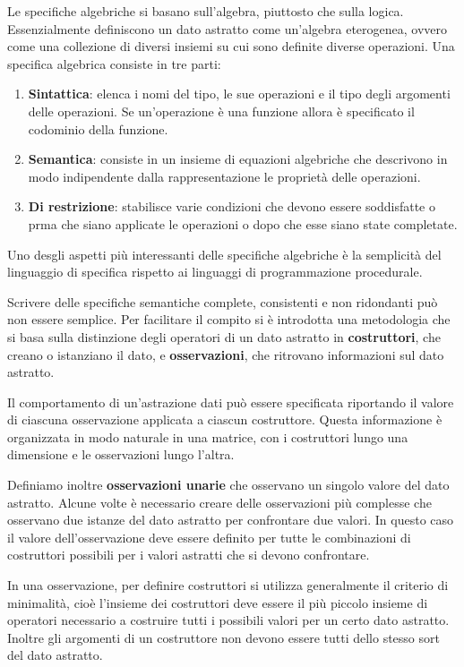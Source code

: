 \documentclass[a4paper,18pt]{extarticle}
\begin{document}
 Le specifiche algebriche si basano sull'algebra, piuttosto che sulla logica. Essenzialmente definiscono un dato astratto come un'algebra eterogenea, ovvero come una collezione di diversi insiemi su cui sono definite diverse operazioni. Una specifica algebrica consiste in tre parti:
 
 \begin{enumerate}
    \item \textbf{Sintattica}: elenca i nomi del tipo, le sue operazioni e il tipo degli argomenti delle operazioni. Se un'operazione è una funzione allora è specificato il codominio della funzione.
    \item \textbf{Semantica}: consiste in un insieme di equazioni algebriche che descrivono in modo indipendente dalla rappresentazione le proprietà delle operazioni.
    \item \textbf{Di restrizione}: stabilisce varie condizioni che devono essere soddisfatte o prma che siano applicate le operazioni o dopo che esse siano state completate.
\end{enumerate}

Uno desgli aspetti più interessanti delle specifiche algebriche è la semplicità del linguaggio di specifica rispetto ai linguaggi di programmazione procedurale.

Scrivere delle specifiche semantiche complete, consistenti e non ridondanti può non essere semplice. Per facilitare il compito si è introdotta una metodologia che si basa sulla distinzione degli operatori di un dato astratto in \textbf{costruttori}, che creano o istanziano il dato, e \textbf{osservazioni}, che ritrovano informazioni sul dato astratto.

Il comportamento di un'astrazione dati può essere specificata riportando il valore di ciascuna osservazione applicata a ciascun costruttore. Questa informazione è organizzata in modo naturale in una matrice, con i costruttori lungo una dimensione e le osservazioni lungo l'altra.

Definiamo inoltre \textbf{osservazioni unarie} che osservano un singolo valore del dato astratto. Alcune volte è necessario creare delle osservazioni più complesse che osservano due istanze del dato astratto per confrontare due valori. In questo caso il valore dell'osservazione deve essere definito per tutte le combinazioni di costruttori possibili per i valori astratti che si devono confrontare.

In una osservazione, per definire  costruttori si utilizza generalmente il criterio di minimalità, cioè l'insieme dei costruttori deve essere il più piccolo insieme di operatori necessario a costruire tutti i possibili valori per un certo dato astratto. Inoltre gli argomenti di un costruttore non devono essere tutti dello stesso sort del dato astratto.
\end{document}
